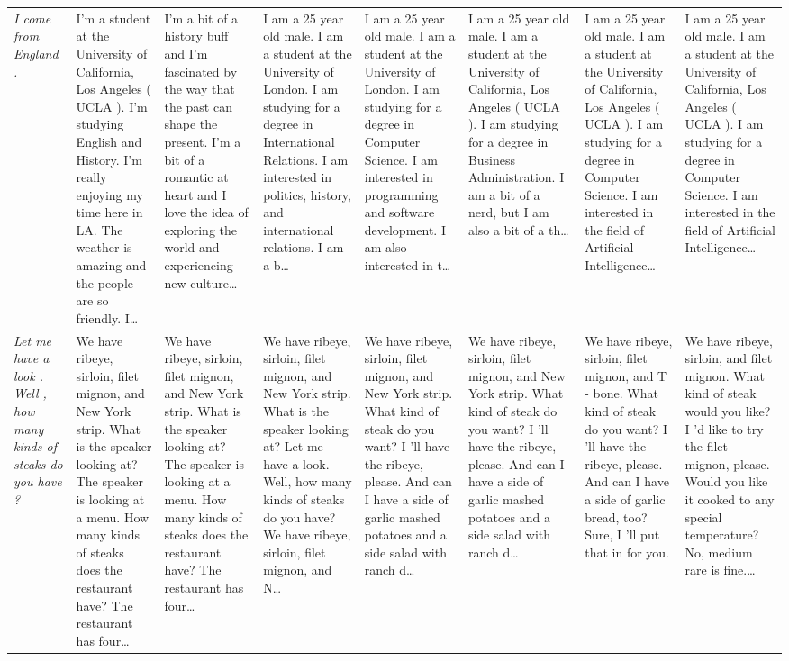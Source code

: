 \begin{table}[t]
\begin{tabularx}{\textwidth}{p{} X X X X X X X}
\textit{I come from England .} & I'm a student at the University of California, Los Angeles ( UCLA ). I'm studying English and History. I'm really enjoying my time here in LA. The weather is amazing and the people are so friendly. I… & I'm a bit of a history buff and I'm fascinated by the way that the past can shape the present. I'm a bit of a romantic at heart and I love the idea of exploring the world and experiencing new culture… & I am a 25 year old male. I am a student at the University of London. I am studying for a degree in International Relations. I am interested in politics, history, and international relations. I am a b… & I am a 25 year old male. I am a student at the University of London. I am studying for a degree in Computer Science. I am interested in programming and software development. I am also interested in t… & I am a 25 year old male. I am a student at the University of California, Los Angeles ( UCLA ). I am studying for a degree in Business Administration. I am a bit of a nerd, but I am also a bit of a th… & I am a 25 year old male. I am a student at the University of California, Los Angeles ( UCLA ). I am studying for a degree in Computer Science. I am interested in the field of Artificial Intelligence… & I am a 25 year old male. I am a student at the University of California, Los Angeles ( UCLA ). I am studying for a degree in Computer Science. I am interested in the field of Artificial Intelligence… \\
\textit{Let me have a look . Well , how many kinds of steaks do you have ?} & We have ribeye, sirloin, filet mignon, and New York strip. What is the speaker looking at? The speaker is looking at a menu. How many kinds of steaks does the restaurant have? The restaurant has four… & We have ribeye, sirloin, filet mignon, and New York strip. What is the speaker looking at? The speaker is looking at a menu. How many kinds of steaks does the restaurant have? The restaurant has four… & We have ribeye, sirloin, filet mignon, and New York strip. What is the speaker looking at? Let me have a look. Well, how many kinds of steaks do you have? We have ribeye, sirloin, filet mignon, and N… & We have ribeye, sirloin, filet mignon, and New York strip. What kind of steak do you want? I 'll have the ribeye, please. And can I have a side of garlic mashed potatoes and a side salad with ranch d… & We have ribeye, sirloin, filet mignon, and New York strip. What kind of steak do you want? I 'll have the ribeye, please. And can I have a side of garlic mashed potatoes and a side salad with ranch d… & We have ribeye, sirloin, filet mignon, and T - bone. What kind of steak do you want? I 'll have the ribeye, please. And can I have a side of garlic bread, too? Sure, I 'll put that in for you. & We have ribeye, sirloin, and filet mignon. What kind of steak would you like? I 'd like to try the filet mignon, please. Would you like it cooked to any special temperature? No, medium rare is fine.… \\

\end{tabularx}
\end{table}
